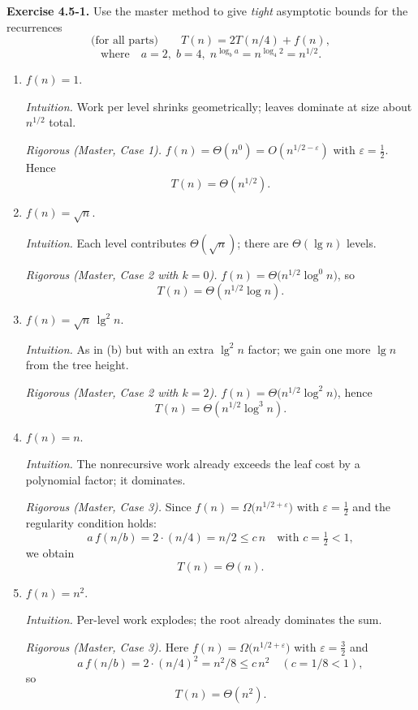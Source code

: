 \documentclass[12pt]{article}
\theoremstyle{definition}
\begin{document}
\noindent\textbf{Exercise 4.5-1.}
Use the master method to give \emph{tight} asymptotic bounds for the recurrences
\[
\text{(for all parts)}\qquad T(n)=2T(n/4)+f(n),
\]
\[
\text{where}\quad a=2,\; b=4,\; n^{\log_b a}=n^{\log_4 2}=n^{1/2}.
\]

\begin{enumerate}
\item $f(n)=1$.

\noindent\textit{Intuition.}
Work per level shrinks geometrically; leaves dominate at size about $n^{1/2}$ total.

\noindent\textit{Rigorous (Master, Case 1).}
$f(n)=\Theta(n^0)=O(n^{1/2-\varepsilon})$ with $\varepsilon=\tfrac{1}{2}$.
Hence
\[
\boxed{T(n)=\Theta\!\left(n^{1/2}\right)}.
\]

\item $f(n)=\sqrt{n}$.

\noindent\textit{Intuition.}
Each level contributes $\Theta(\sqrt{n})$; there are $\Theta(\lg n)$ levels.

\noindent\textit{Rigorous (Master, Case 2 with $k=0$).}
$f(n)=\Theta\!\big(n^{1/2}\log^{0}n\big)$, so
\[
\boxed{T(n)=\Theta\!\left(n^{1/2}\log n\right)}.
\]

\item $f(n)=\sqrt{n}\,\lg^{2}\!n$.

\noindent\textit{Intuition.}
As in (b) but with an extra $\lg^{2}\!n$ factor; we gain one more $\lg n$ from the tree height.

\noindent\textit{Rigorous (Master, Case 2 with $k=2$).}
$f(n)=\Theta\!\big(n^{1/2}\log^{2}n\big)$, hence
\[
\boxed{T(n)=\Theta\!\left(n^{1/2}\log^{3}\!n\right)}.
\]

\item $f(n)=n$.

\noindent\textit{Intuition.}
The nonrecursive work already exceeds the leaf cost by a polynomial factor; it dominates.

\noindent\textit{Rigorous (Master, Case 3).}
Since $f(n)=\Omega\!\big(n^{1/2+\varepsilon}\big)$ with $\varepsilon=\tfrac{1}{2}$ and
the regularity condition holds:
\[
a\,f(n/b)=2\cdot (n/4)=n/2 \le c\,n \quad \text{with } c=\tfrac12<1,
\]
we obtain
\[
\boxed{T(n)=\Theta(n)}.
\]

\item $f(n)=n^{2}$.

\noindent\textit{Intuition.}
Per-level work explodes; the root already dominates the sum.

\noindent\textit{Rigorous (Master, Case 3).}
Here $f(n)=\Omega\!\big(n^{1/2+\varepsilon}\big)$ with $\varepsilon=\tfrac{3}{2}$ and
\[
a\,f(n/b)=2\cdot (n/4)^{2}=n^{2}/8\le c\,n^{2}\quad (c=1/8<1),
\]
so
\[
\boxed{T(n)=\Theta(n^{2})}.
\]
\end{enumerate}
\end{document}
